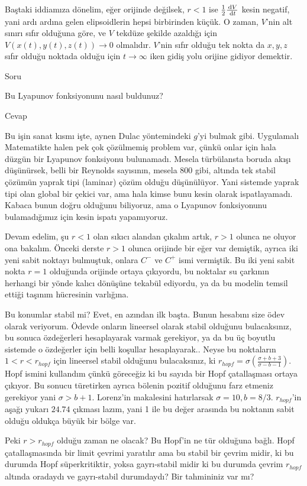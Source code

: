 \documentclass[12pt,fleqn]{article}\usepackage{../../common}
\begin{document}
Baştaki iddiamıza dönelim, eğer orijinde değilsek, $r<1$ ise
$\frac{1}{2} \frac{\,\mathrm{d} V}{\,\mathrm{d} t}$ kesin negatif, yani ardı ardına gelen
elipsoidlerin hepsi birbirinden küçük. O zaman, $V$'nin alt sınırı sıfır
olduğuna göre, ve $V$ tekdüze şekilde azaldığı için
$V(x(t),y(t),z(t)) \to 0$ olmalıdır. $V$'nin sıfır olduğu tek nokta da
$x,y,z$ sıfır olduğu noktada olduğu için $t \to \infty$ iken gidiş yolu
orijine gidiyor demektir.

Soru 

Bu Lyapunov fonksiyonunu nasıl buldunuz? 

Cevap 

Bu işin sanat kısmı işte, aynen Dulac yöntemindeki $g$'yi bulmak
gibi. Uygulamalı Matematikte halen pek çok çözülmemiş problem var, çünkü
onlar için hala düzgün bir Lyapunov fonksiyonu bulunamadı. Mesela
türbülansta boruda akışı düşünürsek, belli bir Reynolds sayısının, mesela
800 gibi, altında tek stabil çözümün yaprak tipi (laminar) çözüm olduğu
düşünülüyor. Yani sistemde yaprak tipi olan global bir çekici var, ama hala
kimse bunu kesin olarak ispatlayamadı. Kabaca bunun doğru olduğunu
biliyoruz, ama o Lyapunov fonksiyonunu bulamadığımız için kesin ispatı
yapamıyoruz.

Devam edelim, şu $r < 1$ olan sıkıcı alandan çıkalım artık, $r > 1$ olunca
ne oluyor ona bakalım. Önceki derste $r>1$ olunca orijinde bir eğer var
demiştik, ayrıca iki yeni sabit noktayı bulmuştuk, onlara $C^-$ ve $C^+$
ismi vermiştik. Bu iki yeni sabit nokta $r=1$ olduğunda orijinde ortaya
çıkıyordu, bu noktalar su çarkının herhangi bir yönde kalıcı dönüşüne
tekabül ediyordu, ya da bu modelin temsil ettiği taşınım hücresinin
varlığına.

Bu konumlar stabil mi? Evet, en azından ilk başta. Bunun hesabını size ödev
olarak veriyorum. Ödevde onların lineersel olarak stabil olduğunu
bulacaksınız, bu sonuca özdeğerleri hesaplayarak varmak gerekiyor, ya da bu
üç boyutlu sistemde o özdeğerler için belli koşullar hesaplayarak.. Neyse
bu noktaların $1 < r < r_{hopf}$ için lineersel stabil olduğunu
bulacaksınız, ki $r_{hopf} = \sigma(\frac{\sigma+b+3}{\sigma-b-1})$. Hopf
ismini kullandım çünkü göreceğiz ki bu sayıda bir Hopf çatallaşması ortaya
çıkıyor. Bu sonucu türetirken ayrıca bölenin pozitif olduğunu farz etmeniz
gerekiyor yani $\sigma > b + 1$. Lorenz'in makalesini hatırlarsak
$\sigma=10,b=8/3$. $r_{hopf}$'in aşağı yukarı $24.74$ çıkması lazım, yani 1
ile bu değer arasında bu noktanın sabit olduğu oldukça büyük bir bölge var.

Peki $r > r_{hopf}$ olduğu zaman ne olacak? Bu Hopf'in ne tür olduğuna
bağlı. Hopf çatallaşmasında bir limit çevrimi yaratılır ama bu stabil bir
çevrim midir, ki bu durumda Hopf süperkritiktir, yoksa gayrı-stabil midir
ki bu durumda çevrim $r_{hopf}$ altında oradaydı ve gayrı-stabil
durumdaydı? Bir tahmininiz var mı? 
\end{document}
